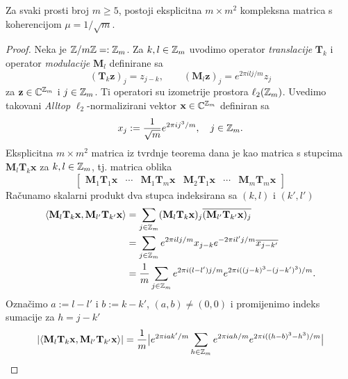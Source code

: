 \documentclass[a4paper,twoside,12pt]{memoir} %
\newcommand{\vect}[1]{\mathbf{#1}}
\renewcommand{\vec}{\vect}
\begin{document}
\begin{thm}\label{tm:5:13}
    Za svaki prosti broj $m \geq 5$, postoji eksplicitna $m \times m^2$ kompleksna matrica s koherencijom $\mu = 1/\sqrt{m}$.
\end{thm}
\begin{proof}
    Neka je $\mathbb{Z} / m \mathbb{Z} =: \mathbb{Z}_m$. Za $k,l \in \mathbb{Z}_m$ uvodimo operator \textit{translacije} $\vec T_k$ i operator \textit{modulacije} $\vec M_l$ definirane sa
    \begin{equation*}
        (\vec T_k \vec z)_j  = z_{j-k}, \quad \quad (\vec M_l \vec z)_j = e^{2 \pi i l j / m}z_j 
    \end{equation*}
    za $\vec z \in \C^{\Z_m}$ i $j \in \mathbb{Z}_m$. Ti operatori su izometrije prostora $\ell_2(\mathbb{Z}_m)$. Uvedimo takovani \textit{Alltop} $\ell_2$-normalizirani vektor $\vec x \in \C^{\Z_m}$ definiran sa
    \begin{equation*}
        x_j := \frac{1}{\sqrt{m}}e^{2\pi i j^3/m}, \quad j \in \mathbb{Z}_m .
    \end{equation*}
    Eksplicitna $m \times m^2$ matrica iz tvrdnje teorema dana je kao matrica s stupcima $\vec M_l \vec T_k \vec x$ za $k,l \in \mathbb{Z}_m$, tj. matrica oblika
    \begin{equation*}
        \begin{bmatrix*}
            \vec M_1 \vec T_1 \vec x & \cdots & \vec M_1 \vec T_m \vec x & \vec M_2 \vec T_1 \vec x & \cdots & \vec M_m \vec T_m \vec x 
        \end{bmatrix*} 
    \end{equation*}
    Ra\v{c}unamo skalarni produkt dva stupca indeksirana sa $(k,l)$ i $(k', l')$
    \begin{align*}
        \langle \vec M_l \vec T_k \vec x, \vec M_{l'} \vec T_{k'} \vec x \rangle &= \sum_{j \in \Z_m} (\vec M_{l} \vec T_{k} \vec x)_j \overline{(\vec M_{l'} \vec T_{k'} \vec x)_j} \\
        &= \sum_{j \in \Z_m} e^{2 \pi ilj/m}x_{j-k} e^{-2 \pi il'j/m}\overline{x_{j-k'}}\\ 
        &= \frac{1}{m} \sum_{j \in \Z_m} e^{2 \pi i(l-l')j/m} e^{2 \pi i((j-k)^3 - (j - k')^3)/m}.
    \end{align*}
    Ozna\v{c}imo $a := l - l'$ i $b := k - k'$, $(a,b) \neq (0,0)$ i promijenimo indeks sumacije za $h = j - k'$
    \begin{align*}
        |\langle \vec M_l \vec T_k \vec x, \vec M_{l'} \vec T_{k'} \vec x \rangle| &= \frac{1}{m} \big |   e^{2 \pi iak'/m}  \sum_{h \in \Z_m} e^{2 \pi iah/m}e^{2 \pi i ((h-b)^3 - h^3)/m}  \big | \\

\end{align*}
\end{proof}
\end{document}
